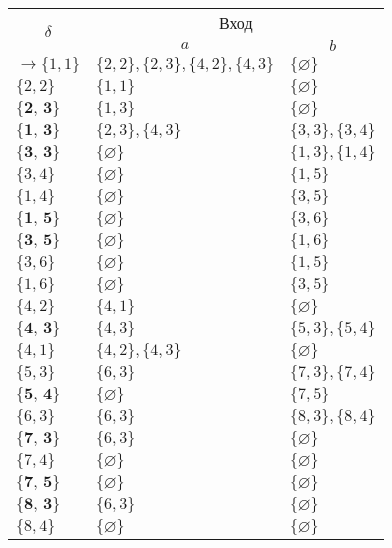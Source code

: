 \begin{enumerate}[label=(\roman{*})]
	
	\begin{center}
		\begin{tabular}{lll}
			\toprule
			\multicolumn{1}{c}{\multirow{2}{*}{\Large $\delta$}}
			& \multicolumn{2}{c}{Вход} \\
			\cmidrule(rl){2-3}
			& \multicolumn{1}{c}{$a$}
			& \multicolumn{1}{c}{$b$}  \\
			\midrule
			$\to \{1, 1\}$       & $\{2, 2\}, \{2, 3\}, \{4, 2\}, \{4, 3\}$     		 & $\{\varnothing\}$      \\
			$\{2, 2\}$       & $\{1, 1\}$    			 & $\{\varnothing\}$      \\
			$\textbf{\{2, 3\}}$       & $\{1, 3\}$    			 & $\{\varnothing\}$      \\
			$\textbf{\{1, 3\}}$       & $\{2, 3\}, \{4, 3\}$     &  $\{3, 3\}, \{3, 4\}$  \\
			$\textbf{\{3, 3\}}$       & $\{\varnothing\}$     &  $\{1, 3\}, \{1, 4\}$  \\
			$\{3, 4\}$       & $\{\varnothing\}$     &  $\{1, 5\}$  \\
			$\{1, 4\}$       & $\{\varnothing\}$     &  $\{3, 5\}$  \\
			$\textbf{\{1, 5\}}$       & $\{\varnothing\}$     &  $\{3, 6\}$  \\
			$\textbf{\{3, 5\}}$       & $\{\varnothing\}$     &  $\{1, 6\}$  \\
			$\{3, 6\}$       & $\{\varnothing\}$     &  $\{1, 5\}$  \\
			$\{1, 6\}$       & $\{\varnothing\}$     &  $\{3, 5\}$  \\
			$\{4, 2\}$       & $\{4, 1\}$    			 & $\{\varnothing\}$      \\
			$\textbf{\{4, 3\}}$       & $\{4, 3\}$    			 & $\{5, 3\}, \{5, 4\}$      \\
			$\{4, 1\}$       & $\{4, 2\}, \{4, 3\}$    			 & $\{\varnothing\}$      \\
			$\{5, 3\}$       & $\{6, 3\}$    			 & $\{7, 3\}, \{7, 4\}$      \\
			$\textbf{\{5, 4\}}$       & $\{\varnothing\}$    			 & $\{7, 5\}$      \\
			$\{6, 3\}$       & $\{6, 3\}$    			 & $\{8, 3\}, \{8, 4\}$      \\
			$\textbf{\{7, 3\}}$       & $\{6, 3\}$    			 & $\{\varnothing\}$      \\
			$\{7, 4\}$       & $\{\varnothing\}$    			 & $\{\varnothing\}$      \\
			$\textbf{\{7, 5\}}$       & $\{\varnothing\}$    			 & $\{\varnothing\}$      \\
			$\textbf{\{8, 3\}}$       & $\{6, 3\}$    			 & $\{\varnothing\}$      \\
			$\{8, 4\}$       & $\{\varnothing\}$    			 & $\{\varnothing\}$      \\
			\bottomrule
		\end{tabular}
	\end{center}



\end{enumerate}
